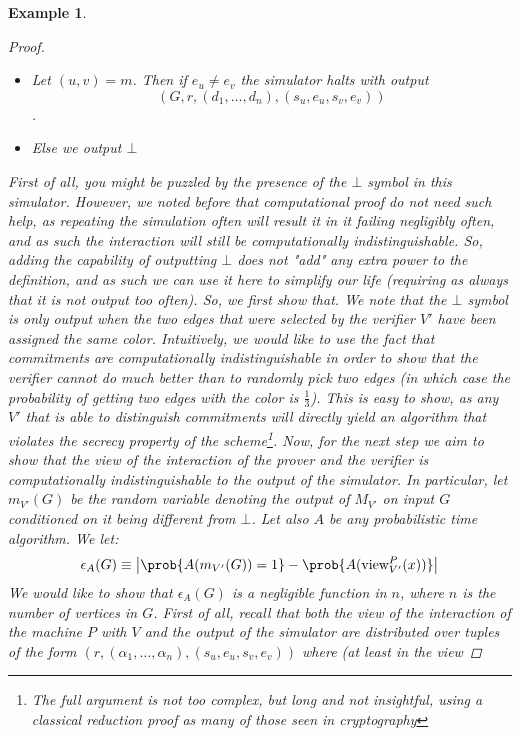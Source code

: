 \documentclass{article}
\newtheorem{example}{Example}
\begin{document}
\begin{example}
\begin{proof}
\begin{itemize}
                  assume that $m \in E$, as if it is not we can adapt $M_{V'}$ so that is selected some edge in $E$ to be used.
            \item Let $(u, v) = m$. Then if $e_u \neq e_v$ the simulator halts with output \[(G, r, (d_1, \dots, d_n), (s_u, e_u, s_v, e_v))\].
            \item Else we output $\bot$
        \end{itemize}
        First of all, you might be puzzled by the presence of the $\bot$ symbol in this simulator. 
        However, we noted before that computational proof do not need such help, as repeating the simulation often 
        will result it in it failing negligibly often, and as such the interaction will still be computationally indistinguishable.
        So, adding the capability of outputting $\bot$ does not "add" any extra power to the definition, and as such we
        can use it here to simplify our life (requiring as always that it is not output too often).
        So, we first show that. We note that the $\bot$ symbol is only output when 
        the two edges that were selected by the verifier $V'$ have been assigned the same color. 
        Intuitively, we would like to use the fact that commitments are computationally indistinguishable
        in order to show that the verifier cannot do much better than to randomly pick two edges (in which 
        case the probability of getting two edges with the color is $\frac{1}{3}$). This is easy to show,
        as any $V'$ that is able to distinguish commitments will directly yield an algorithm that violates 
        the secrecy property of the scheme\footnote{The full argument is not too complex, but long and not
        insightful, using a classical reduction proof as many of those seen in cryptography}. 
        Now, for the next step we aim to show that the view of the interaction of the prover and the verifier is 
        computationally indistinguishable to the output of the simulator. In particular, let $m_{V'}(G)$ be the 
        random variable denoting the output of $M_{V'}$ on input $G$ conditioned on it being different from $\bot$.
        Let also $A$ be any probabilistic time algorithm.
        We let:
        \[ \epsilon_A(G) \equiv \left| \prob{A(m_{V'}(G)) = 1} - \prob{A(\text{view}^{P}_{V'}(x))} \right| \] 
        We would like to show that $\epsilon_A(G)$ is a negligible function in $n$, where $n$ is the number 
        of vertices in $G$. First of all, recall that both the view of the interaction of the machine $P$ with $V$ 
        and the output of the simulator are distributed over tuples of the form $(r, (\alpha_1, \dots , \alpha_n), (s_u, e_u, s_v, e_v))$ where (at least in the view 

\end{proof}
\end{example}
\end{document}
